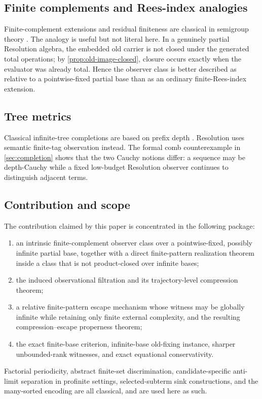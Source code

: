 \subsection{Finite complements and Rees-index analogies}
Finite-complement extensions and residual finiteness are classical in semigroup
theory \cite{CainMaltcev2013,RuskucThomas1998}.  The analogy is useful but not
literal here.  In a genuinely partial Resolution algebra, the embedded old
carrier is not closed under the generated total operations; by
\cref{prop:old-image-closed}, closure occurs exactly when the evaluator was
already total.  Hence the observer class is better described as relative to a
pointwise-fixed partial base than as an ordinary finite-Rees-index extension.

\subsection{Tree metrics}
Classical infinite-tree completions are based on prefix depth
\cite{ArnoldNivat1980,Courcelle1983}.  Resolution uses semantic finite-tag
observation instead.  The formal comb counterexample in \cref{sec:completion}
shows that the two Cauchy notions differ: a sequence may be depth-Cauchy while a
fixed low-budget Resolution observer continues to distinguish adjacent terms.

\subsection{Contribution and scope}
The contribution claimed by this paper is concentrated in the following
package:
\begin{enumerate}
  \item an intrinsic finite-complement observer class over a pointwise-fixed,
        possibly infinite partial base, together with a direct finite-pattern
        realization theorem inside a class that is not product-closed over
        infinite bases;
  \item the induced observational filtration and its trajectory-level
        compression theorem;
  \item a relative finite-pattern escape mechanism whose witness may be
        globally infinite while retaining only finite external complexity, and
        the resulting compression--escape properness theorem;
  \item the exact finite-base criterion, infinite-base old-fixing instance,
        sharper unbounded-rank witnesses, and exact equational conservativity.
\end{enumerate}
Factorial periodicity, abstract finite-set discrimination, candidate-specific
anti-limit separation in profinite settings, selected-subterm sink
constructions, and the many-sorted encoding are all classical, and are used
here as such.
